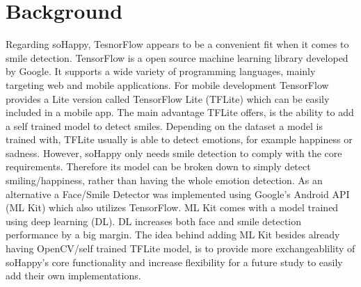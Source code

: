\section{Background} \label{sec:background}
Regarding soHappy, TesnorFlow \cite{tensorflow} appears to be a convenient fit when it comes to smile detection.
TensorFlow is a open source machine learning library developed by Google.
It supports a wide variety of programming languages, mainly targeting web and mobile applications.
For mobile development TensorFlow provides a Lite version called TensorFlow Lite (TFLite) which can be easily included in a mobile app.
The main advantage TFLite offers, is the ability to add a self trained model to detect smiles.
Depending on the dataset a model is trained with, TFLite usually is able to detect emotions, for example happiness or sadness.
However, soHappy only needs smile detection to comply with the core requirements.
Therefore its model can be broken down to simply detect smiling/happiness, rather than having the whole emotion detection.
As an alternative a Face/Smile Detector was implemented using Google's Android API (ML Kit) \cite{mlkit} which also utilizes TensorFlow.
ML Kit comes with a model trained using deep learning (DL).
DL increases both face and smile detection performance by a big margin.
The idea behind adding ML Kit besides already having OpenCV/self trained TFLite model, is to provide more exchangeablility of soHappy's core functionality and increase flexibility for a future study to easily add their own implementations.
